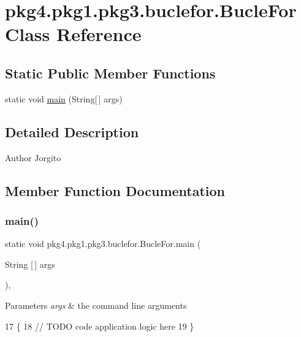 \hypertarget{classpkg4_1_1pkg1_1_1pkg3_1_1buclefor_1_1_bucle_for}{}\section{pkg4.\+pkg1.\+pkg3.\+buclefor.\+Bucle\+For Class Reference}
\label{classpkg4_1_1pkg1_1_1pkg3_1_1buclefor_1_1_bucle_for}
\subsection*{Static Public Member Functions}
\begin{DoxyCompactItemize}
\item 
static void \mbox{\hyperlink{classpkg4_1_1pkg1_1_1pkg3_1_1buclefor_1_1_bucle_for_ab195e5268aaeeacfd85eeac019377184}{main}} (String\mbox{[}$\,$\mbox{]} args)
\end{DoxyCompactItemize}


\subsection{Detailed Description}
\begin{DoxyAuthor}{Author}
Jorgito 
\end{DoxyAuthor}


\subsection{Member Function Documentation}
\mbox{\label{classpkg4_1_1pkg1_1_1pkg3_1_1buclefor_1_1_bucle_for_ab195e5268aaeeacfd85eeac019377184}} 
\subsubsection{\texorpdfstring{main()}{main()}}
{\footnotesize\ttfamily static void pkg4.\+pkg1.\+pkg3.\+buclefor.\+Bucle\+For.\+main (\begin{DoxyParamCaption}\item[{String \mbox{[}$\,$\mbox{]}}]{args }\end{DoxyParamCaption})\hspace{0.3cm}{\ttfamily [inline]}, {\ttfamily [static]}}


\begin{DoxyParams}{Parameters}
{\em args} & the command line arguments \\
\hline
\end{DoxyParams}

\begin{DoxyCode}
17                                            \{
18         \textcolor{comment}{// TODO code application logic here}
19     \}
\end{DoxyCode}
